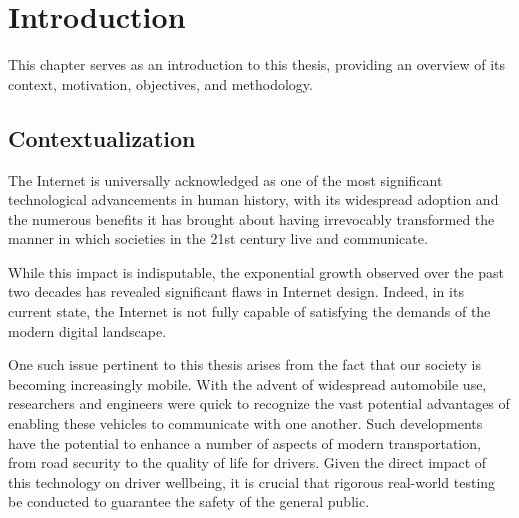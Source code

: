 
%

\chapter{Introduction}
\label{cha:introduction}

This chapter serves as an introduction to this thesis, providing an overview of its context, motivation, objectives, and methodology.

\section{Contextualization} %
\label{sec:contex}



The Internet is universally acknowledged as one of the most significant technological advancements in human history, with its widespread adoption and the numerous benefits it has brought about having irrevocably transformed the manner in which societies in the 21st century live and communicate.

While this impact is indisputable, the exponential growth observed over the past two decades has revealed significant flaws in Internet design. Indeed, in its current state, the Internet is not fully capable of satisfying the demands of the modern digital landscape. 

One such issue pertinent to this thesis arises from the fact that our society is becoming increasingly mobile. With the advent of widespread automobile use, researchers and engineers were quick to recognize the vast potential advantages of enabling these vehicles to communicate with one another. Such developments have the potential to enhance a number of aspects of modern transportation, from road security to the quality of life for drivers.
Given the direct impact of this technology on driver wellbeing, it is crucial that rigorous real-world testing be conducted to guarantee the safety of the general public.

